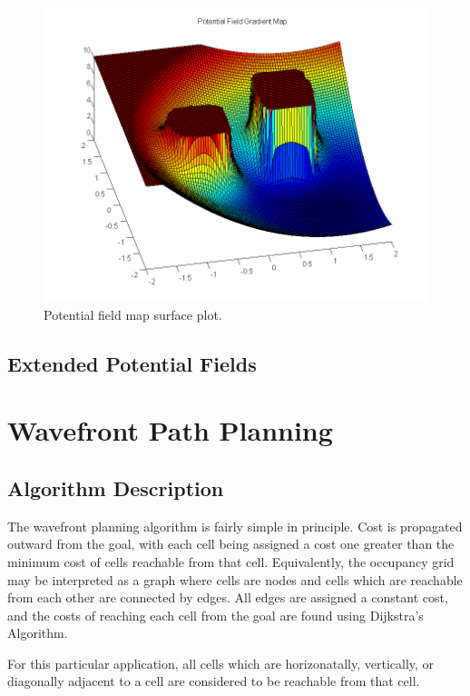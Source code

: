 \documentclass[11pt]{article} %
\begin{document}
\begin{figure}[hbt]
 \centering
 \includegraphics[scale=0.60]{Potential_Field_Surf_Plot.png}
 \caption{Potential field map surface plot.}
 \label{potField_Surf}
\end{figure}


\subsection{Extended Potential Fields}

\clearpage
\section{Wavefront Path Planning}

\subsection{Algorithm Description}
The wavefront planning algorithm is fairly simple in principle.  Cost is propagated outward from the goal, with each cell being assigned a cost one greater than the minimum cost of cells reachable from that cell.  Equivalently, the occupancy grid may be interpreted as a graph where cells are nodes and cells which are reachable from each other are connected by edges.  All edges are assigned a constant cost, and the costs of reaching each cell from the goal are found using Dijkstra's Algorithm.

For this particular application, all cells which are horizonatally, vertically, or diagonally adjacent to a cell are considered to be reachable from that cell.
\end{document}
